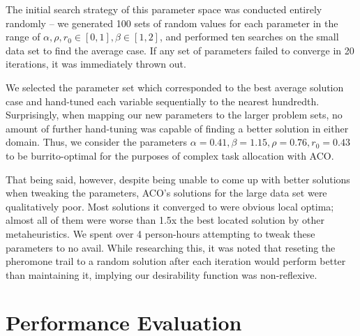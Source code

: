 \documentclass[a4paper]{article}
\begin{document}
The initial search strategy of this parameter space was conducted entirely randomly -- we generated 100 sets of random values for each parameter in the range of $\alpha, \rho, r_0 \in [0, 1], \beta \in [1, 2]$, and performed ten searches on the small data set to find the average case. If any set of parameters failed to converge in 20 iterations, it was immediately thrown out.

We selected the parameter set which corresponded to the best average solution case and hand-tuned each variable sequentially to the nearest hundredth. Surprisingly, when mapping our new parameters to the larger problem sets, no amount of further hand-tuning was capable of finding a better solution in either domain. Thus, we consider the parameters $\alpha = 0.41, \beta = 1.15, \rho = 0.76, r_0 = 0.43$ to be burrito-optimal for the purposes of complex task allocation with ACO.

That being said, however, despite being unable to come up with better solutions when tweaking the parameters, ACO's solutions for the large data set were qualitatively poor. Most solutions it converged to were obvious local optima; almost all of them were worse than 1.5x the best located solution by other metaheuristics. We spent over 4 person-hours attempting to tweak these parameters to no avail. While researching this, it was noted that reseting the pheromone trail to a random solution after each iteration would perform better than maintaining it, implying our desirability function was non-reflexive.


\section{Performance Evaluation}



\end{document}
